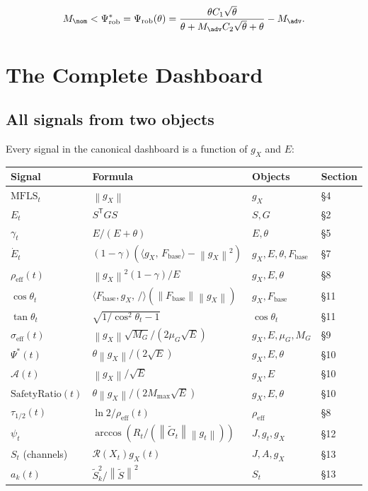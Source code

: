 \documentclass[11pt,a4paper]{article}
\theoremstyle{definition}
\newcommand{\T}{^{\mathsf{T}}}
\newcommand{\norm}[1]{\left\|#1\right\|}
\newcommand{\inner}[2]{\langle #1,\,#2\rangle}
\newcommand{\Fbase}{F_{\mathrm{base}}}
\newcommand{\gX}{g_X}
\newcommand{\mfls}{\mathrm{MFLS}}
\begin{document}
\[
M_\nom < \Psi^*_\mathrm{rob} = \Psi_\mathrm{rob}(\theta) = \frac{\theta C_1\sqrt{\theta}}{\theta + M_\adv C_2\sqrt{\theta} + \theta} - M_\adv.
\]

\section{The Complete Dashboard}

\subsection{All signals from two objects}

Every signal in the canonical dashboard is a function of $\gX$ and $E$:

\begin{center}
\renewcommand{\arraystretch}{1.4}
\begin{tabular}{llll}
\toprule
Signal & Formula & Objects & Section \\
\midrule
$\mfls_t$ & $\norm{\gX}$ & $\gX$ & \S4 \\
$E_t$ & $S\T GS$ & $S, G$ & \S2 \\
$\gamma_t$ & $E/(E+\theta)$ & $E,\theta$ & \S5 \\
$\dot E_t$ & $(1-\gamma)(\inner{\gX}{\Fbase}-\norm{\gX}^2)$ & $\gX,E,\theta,\Fbase$ & \S7 \\
$\rho_\mathrm{eff}(t)$ & $\norm{\gX}^2(1-\gamma)/E$ & $\gX,E,\theta$ & \S8 \\
$\cos\theta_t$ & $\inner{\Fbase,\gX}/(\norm{\Fbase}\norm{\gX})$ & $\gX,\Fbase$ & \S11 \\
$\tan\theta_t$ & $\sqrt{1/\cos^2\theta_t - 1}$ & $\cos\theta_t$ & \S11 \\
$\sigma_\mathrm{eff}(t)$ & $\norm{\gX}\sqrt{M_G}/(2\mu_G\sqrt{E})$ & $\gX,E,\mu_G,M_G$ & \S9 \\
$\Psi^*(t)$ & $\theta\norm{\gX}/(2\sqrt{E})$ & $\gX,E,\theta$ & \S10 \\
$\mathcal{A}(t)$ & $\norm{\gX}/\sqrt{E}$ & $\gX,E$ & \S10 \\
$\mathrm{SafetyRatio}(t)$ & $\theta\norm{\gX}/(2M_\mathrm{max}\sqrt{E})$ & $\gX,E,\theta$ & \S10 \\
$\tau_{1/2}(t)$ & $\ln 2/\rho_\mathrm{eff}(t)$ & $\rho_\mathrm{eff}$ & \S8 \\
$\psi_t$ & $\arccos(R_t/(\norm{\tilde G_t}\norm{g_t}))$ & $J,g_t,\gX$ & \S12 \\
$S_t$ (channels) & $\mathcal{R}(X_t)\gX(t)$ & $J,A,\gX$ & \S13 \\
$a_k(t)$ & $\tilde S_k^2/\norm{\tilde S}^2$ & $S_t$ & \S13 \\
\bottomrule
\end{tabular}
\end{center}
\end{document}
